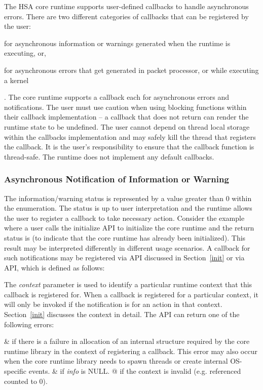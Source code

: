 The HSA core runtime supports user-defined callbacks to handle
asynchronous errors. There are two different categories of callbacks
that can be registered by the user: \begin{inparaenum}[(i)] \item
for asynchronous information or warnings generated when the runtime
is executing, or, \item for asynchronous errors that get generated
in packet processor, or while executing a kernel \end{inparaenum}.
The core runtime supports a callback each for asynchronous errors
and notifications.
The user must use caution when using blocking functions within their
callback implementation -- a callback that does not return can
render the runtime state to be undefined. The user cannot depend on
thread local storage within the callbacks implementation and may
safely kill the thread that registers the callback. It is the user's
responsibility to ensure that the callback function is thread-safe.
The runtime does not implement any default callbacks.

\subsubsection{Asynchronous Notification of Information or
Warning}\label{asynnotif}

The information/warning status is represented by a value greater
than 0 within the  enumeration. The status is
up to user interpretation and the runtime allows the user to
register a callback to take necessary action. Consider the example
where a user calls the initialize API to initialize the core runtime
and the return status is
 (to indicate that
the core runtime has already been initialized). This result may be
interpreted differently in different usage scenarios. A callback for
such notifications may be registered via  API
discussed in Section~\ref{init} or via
 API, which is defined
as follows:



The {\itshape context} parameter is used to identify a particular
runtime context that this callback is registered for. When a
callback is registered for a particular context, it will only be
invoked if the notification is for an action in that context.
Section~\ref{init} discusses the context in detail. The
 API can return one of
the following errors:
\begin{easylist}
&  if there is a failure
in allocation of an internal structure required by the core runtime
library in the context of registering a callback. This error may
also occur when the core runtime library needs to spawn threads or
create internal OS-specific events.
& 
if {\itshape info} is NULL.
@  if the context is invalid
(e.g. referenced counted to 0).
\end{easylist}

